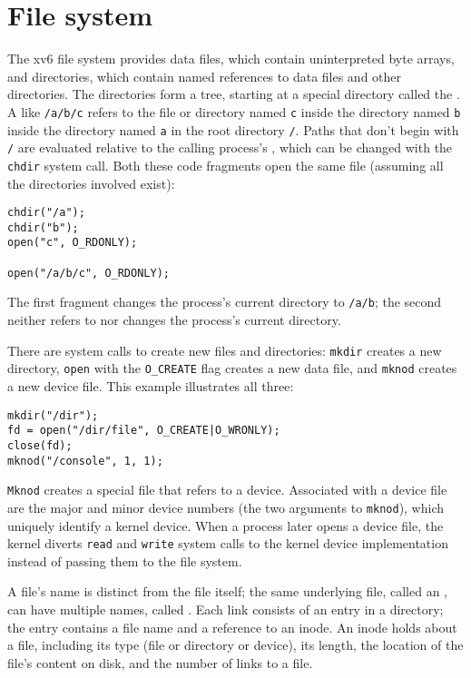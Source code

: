 \section{File system}

The xv6 file system provides data files,
which contain uninterpreted byte arrays,
and directories, which
contain named references to data files and other directories.
The directories form a tree, starting
at a special directory called the 
.
A 
like
\lstinline{/a/b/c}
refers to the file or directory named
\lstinline{c}
inside the directory named
\lstinline{b}
inside the directory named
\lstinline{a}
in the root directory
\lstinline{/}.
Paths that don't begin with
\lstinline{/}
are evaluated relative to the calling process's
,
which can be changed with the
\lstinline{chdir}
system call.
Both these code fragments open the same file
(assuming all the directories involved exist):
\begin{lstlisting}[]
chdir("/a");
chdir("b");
open("c", O_RDONLY);

open("/a/b/c", O_RDONLY);
\end{lstlisting}
The first fragment changes the process's current directory to
\lstinline{/a/b};
the second neither refers to nor changes the process's current directory.

There are system calls to create new files and directories:
\lstinline{mkdir}
creates a new directory,
\lstinline{open}
with the
\lstinline{O_CREATE}
flag creates a new data file,
and
\lstinline{mknod}
creates a new device file.
This example illustrates all three:
\begin{lstlisting}[]
mkdir("/dir");
fd = open("/dir/file", O_CREATE|O_WRONLY);
close(fd);
mknod("/console", 1, 1);
\end{lstlisting}
\lstinline{Mknod}
creates a special file that refers to a device.
Associated with a device file are
the major and minor device numbers
(the two arguments to 
\lstinline{mknod}),
which uniquely identify a kernel device.
When a process later opens a device file, the kernel
diverts
\lstinline{read}
and
\lstinline{write}
system calls to the kernel device implementation
instead of passing them to the file system.

A file's name is distinct from the file itself;
the same underlying file, called an 
, 
can have multiple names,
called 
.
Each link consists of an entry in a directory;
the entry contains a file name and a reference
to an inode.
An inode holds
about a file, including
its type (file or directory or device),
its length,
the location of the file's content on disk,
and the number of links to a file.

